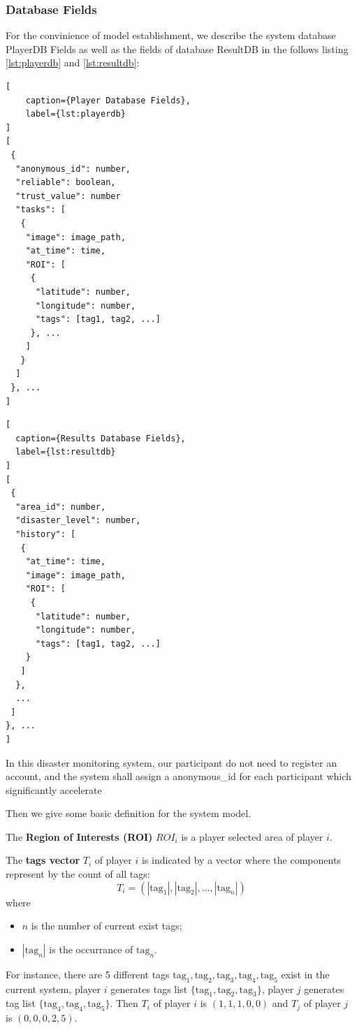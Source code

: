 \subsubsection{Database Fields}

  For the convinience of model establishment, we describe the system database PlayerDB 
  Fields as well as the fields of database ResultDB in the follows listing \ref{lst:playerdb}
  and \ref{lst:resultdb}:

\noindent\begin{minipage}{.45\textwidth}
\begin{lstlisting}[
    caption={Player Database Fields},
    label={lst:playerdb}
]
[
 {
  "anonymous_id": number,
  "reliable": boolean,
  "trust_value": number
  "tasks": [
   {
    "image": image_path,
    "at_time": time, 
    "ROI": [
     {
      "latitude": number,
      "longitude": number,
      "tags": [tag1, tag2, ...]
     }, ...
    ]
   }
  ]
 }, ...
]
\end{lstlisting}
\end{minipage}\hfill
\begin{minipage}{.45\textwidth}
\begin{lstlisting}[
  caption={Results Database Fields},
  label={lst:resultdb}
]
[
 {
  "area_id": number,
  "disaster_level": number,
  "history": [
   {
    "at_time": time,
    "image": image_path,
    "ROI": [
     {
      "latitude": number,
      "longitude": number,
      "tags": [tag1, tag2, ...]
    }
   ]
  }, 
  ...
 ]
}, ...
]
\end{lstlisting}
\end{minipage}

  In this disaster monitoring system, our participant do not need to register an account,
  and the system shall assign a anonymous\_id for each participant which significantly 
  accelerate 

  Then we give some basic definition for the system model.

  \begin{definition}
  \label{def:roi}
  The \textbf{Region of Interests (ROI)} $ROI_i$ is a player selected area of player $i$.
  \end{definition}

  \begin{definition}
  \label{def:tagv}
  The \textbf{tags vector} $T_i$ of player $i$ is indicated by a vector where the components represent by the count of all tags:
  \[
    T_i = (|\text{tag}_1|, |\text{tag}_2|, ..., |\text{tag}_n|)
  \]
  where 
  \begin{itemize}
  \item $n$ is the number of current exist tags;
  \item $|\text{tag}_n|$ is the occurrance of $\text{tag}_n$.
  \end{itemize}
  \end{definition}
  For instance, there are 5 different tags $\text{tag}_1, \text{tag}_2, \text{tag}_3, \text{tag}_4, \text{tag}_5$ exist in the current system,
  player $i$ generates tags list $\{\text{tag}_1, \text{tag}_2, \text{tag}_3\}$, player $j$ generates tag list
  $\{\text{tag}_4, \text{tag}_4, \text{tag}_5\}$. Then $T_i$ of player $i$ is $(1, 1, 1, 0, 0)$ and $T_j$ of player $j$ is $(0, 0, 0, 2, 5)$.

